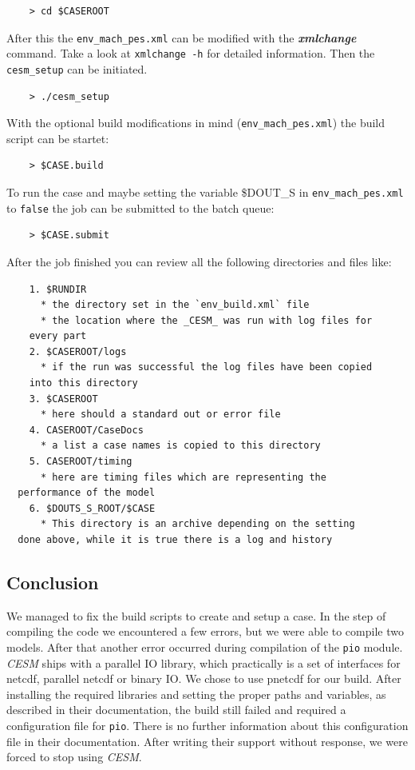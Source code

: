 \documentclass[]{article}
\begin{document}
\begin{verbatim}
    > cd $CASEROOT
\end{verbatim}

After this the \texttt{env\_mach\_pes.xml} can be modified with the
\textbf{\emph{xmlchange}} command. Take a look at \texttt{xmlchange\ -h}
for detailed information. Then the \texttt{cesm\_setup} can be
initiated.

\begin{verbatim}
    > ./cesm_setup
\end{verbatim}

With the optional build modifications in mind
(\texttt{env\_mach\_pes.xml}) the build script can be startet:

\begin{verbatim}
    > $CASE.build
\end{verbatim}

To run the case and maybe setting the variable \$DOUT\_S in
\texttt{env\_mach\_pes.xml} to \texttt{false} the job can be submitted
to the batch queue:

\begin{verbatim}
    > $CASE.submit
\end{verbatim}

After the job finished you can review all the following directories and
files like:

\begin{verbatim}
    1. $RUNDIR
      * the directory set in the `env_build.xml` file
      * the location where the _CESM_ was run with log files for
    every part
    2. $CASEROOT/logs
      * if the run was successful the log files have been copied
    into this directory
    3. $CASEROOT
      * here should a standard out or error file
    4. CASEROOT/CaseDocs
      * a list a case names is copied to this directory
    5. CASEROOT/timing
      * here are timing files which are representing the
  performance of the model
    6. $DOUTS_S_ROOT/$CASE
      * This directory is an archive depending on the setting
  done above, while it is true there is a log and history
\end{verbatim}

\subsection{Conclusion}\label{conclusion}

We managed to fix the build scripts to create and setup a case. In the
step of compiling the code we encountered a few errors, but we were able
to compile two models. After that another error occurred during
compilation of the \texttt{pio} module. \emph{CESM} ships with a
parallel IO library, which practically is a set of interfaces for
netcdf, parallel netcdf or binary IO. We chose to use pnetcdf for our
build. After installing the required libraries and setting the proper
paths and variables, as described in their documentation, the build
still failed and required a configuration file for \texttt{pio}. There
is no further information about this configuration file in their
documentation. After writing their support without response, we were
forced to stop using \emph{CESM}.
\end{document}
